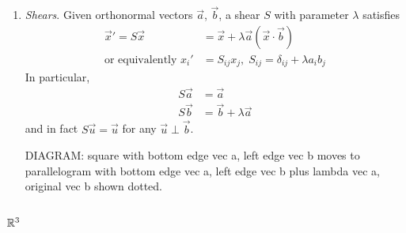 \documentclass{../template/note}
\begin{document}
    \begin{enumerate}[resume]
        \item \emph{Shears}. Given orthonormal vectors \(\vec a\), \(\vec b\), a shear \(S\) with parameter \(\lambda\) satisfies
        \begin{align*}
            \vec x' = S \vec x &= \vec x + \lambda \vec a (\vec x \cdot \vec b) \\
            \text{or equivalently }x_i' &= S_{ij} x_j, \; S_{ij} = \delta_{ij} + \lambda a_i b_j
        \end{align*}
        In particular,
        \begin{align*}
            S\vec a &= \vec a \\
            S\vec b &= \vec b + \lambda \vec a            
        \end{align*}
        and in fact \(S \vec u = \vec u\) for any \(\vec u \perp \vec b\).

        DIAGRAM: square with bottom edge vec a, left edge vec b moves to parallelogram with bottom edge vec a, left edge vec b plus lambda vec a, original vec b shown dotted.
        
    \end{enumerate}
    
    \subsubsection{\(\mathbb R^3\)}
    
\end{document}
